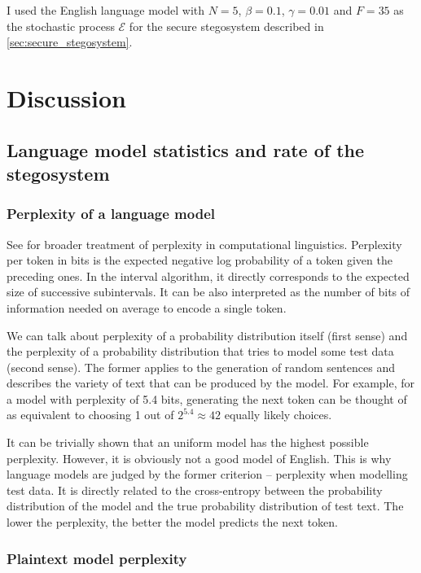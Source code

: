\documentclass[draft]{IIBproject}
\makeatletter
\DeclareRobustCommand*{\AbbreviationWithDot}[1]{\@ifnextchar{.}{#1}{#1.\@\xspace}}
\DeclareRobustCommand*{\iid}{\AbbreviationWithDot{i.i.d}}
\makeatother
\begin{document}
I used the English language model with $N = 5$, $\beta = 0.1$, $\gamma = 0.01$ and $F = 35$ as the stochastic process $\mathcal E$ for the secure stegosystem described in \cref{sec:secure_stegosystem}.

\clearpage
\section{Discussion}

\subsection{Language model statistics and rate of the stegosystem}

\subsubsection{Perplexity of a language model}

See \cite{brown1992entropy} for broader treatment of perplexity in computational linguistics. Perplexity per token in bits is the expected negative log probability of a token given the preceding ones. In the interval algorithm, it directly corresponds to the expected size of successive subintervals. It can be also interpreted as the number of bits of information needed on average to encode a single token.

We can talk about perplexity of a probability distribution itself (first sense) and the perplexity of a probability distribution that tries to model some test data (second sense). The former applies to the generation of random sentences and describes the variety of text that can be produced by the model. For example, for a model with perplexity of 5.4 bits, generating the next token can be thought of as equivalent to choosing 1 out of $2^{5.4} \approx 42$ equally likely choices.

It can be trivially shown that an \iid uniform model has the highest possible perplexity. However, it is obviously not a good model of English. This is why language models are judged by the former criterion -- perplexity when modelling test data. It is directly related to the cross-entropy between the probability distribution of the model and the true probability distribution of test text. The lower the perplexity, the better the model predicts the next token.

\subsubsection{Plaintext model perplexity}
\end{document}
